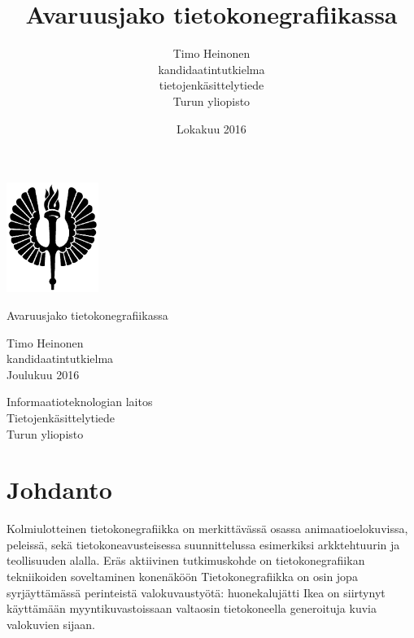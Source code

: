 \documentclass[a4paper,12pt, titlepage]{article}
\title{Avaruusjako tietokonegrafiikassa}
\author{Timo Heinonen \\kandidaatintutkielma \\ tietojenkäsittelytiede \\ Turun yliopisto}
\date{Lokakuu 2016}
\theoremstyle{break}
\begin{document}
\thispagestyle{empty}


\begin{center}
\includegraphics[width=3cm]{soihtu.png}
\end{center}

\vspace{2.0cm}
\begin{center}\large
Avaruusjako tietokonegrafiikassa
\end{center}

\begin{center}
Timo Heinonen\\
kandidaatintutkielma\\
Joulukuu 2016
\end{center}

\begin{center}
Informaatioteknologian laitos\\
Tietojenkäsittelytiede\\
Turun yliopisto\\
\end{center}


\begin{figure}[b]
\vspace*{-5.0cm}
\end{figure}


\newpage
\setcounter{tocdepth}{2} %
\tableofcontents

\newpage
\section{Johdanto}

Kolmiulotteinen tietokonegrafiikka on merkittävässä osassa animaatioelokuvissa, peleissä, sekä tietokoneavusteisessa suunnittelussa esimerkiksi arkktehtuurin ja teollisuuden alalla. Eräs aktiivinen tutkimuskohde on tietokonegrafiikan tekniikoiden soveltaminen konenäköön \cite{hughes} Tietokonegrafiikka on osin jopa syrjäyttämässä perinteistä valokuvaustyötä: huonekalujätti Ikea on siirtynyt käyttämään myyntikuvastoissaan valtaosin tietokoneella generoituja kuvia valokuvien sijaan.\cite{ikea}\\
\end{document}
